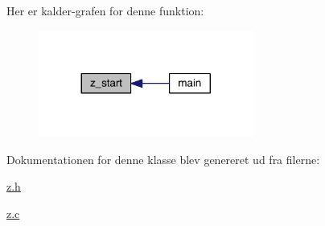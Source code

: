 Her er kalder-\/grafen for denne funktion\+:
\nopagebreak
\begin{figure}[H]
\begin{center}
\leavevmode
\includegraphics[width=200pt]{d7/d97/class_z_affabc649bbf2e5dbeb475777391513d7_icgraph}
\end{center}
\end{figure}




Dokumentationen for denne klasse blev genereret ud fra filerne\+:\begin{DoxyCompactItemize}
\item 
\hyperlink{z_8h}{z.\+h}\item 
\hyperlink{z_8c}{z.\+c}\end{DoxyCompactItemize}
